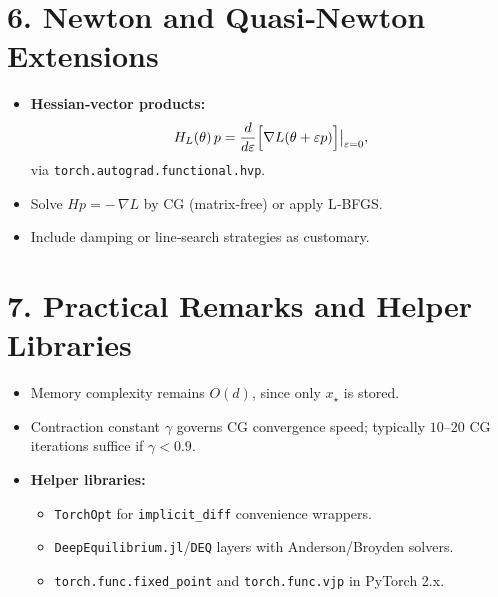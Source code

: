 \documentclass{article}
\begin{document}
\section*{6. Newton and Quasi‐Newton Extensions}
\begin{itemize}
  \item \textbf{Hessian‐vector products:} 
    \[
      H_L(\theta)\,p
      = \frac{d}{d\varepsilon}\Bigl[\nabla L(\theta+\varepsilon p)\Bigr]
      \big|_{\varepsilon=0},
    \]
    via \texttt{torch.autograd.functional.hvp}.
  \item Solve \(H p = -\,\nabla L\) by CG (matrix‐free) or apply L‐BFGS.
  \item Include damping or line‐search strategies as customary.
\end{itemize}

\section*{7. Practical Remarks and Helper Libraries}
\begin{itemize}
  \item Memory complexity remains \(O(d)\), since only \(x_\star\) is stored.
  \item Contraction constant \(\gamma\) governs CG convergence speed; typically
    \(10\text{--}20\) CG iterations suffice if \(\gamma<0.9\).
  \item \textbf{Helper libraries:}
    \begin{itemize}
      \item \texttt{TorchOpt} for \texttt{implicit\_diff} convenience wrappers.
      \item \texttt{DeepEquilibrium.jl}/\texttt{DEQ} layers with Anderson/Broyden solvers.
      \item \texttt{torch.func.fixed\_point} and \texttt{torch.func.vjp} in PyTorch 2.x.
    \end{itemize}
\end{itemize}
\end{document}
